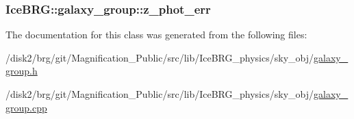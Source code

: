 \subsubsection[{z\+\_\+phot\+\_\+err}]{ Ice\+B\+R\+G\+::galaxy\+\_\+group\+::z\+\_\+phot\+\_\+err}\label{classIceBRG_1_1galaxy__group_a6696a2e58e33e858f1dd40a285cf432a}


The documentation for this class was generated from the following files\+:\begin{DoxyCompactItemize}
\item 
/disk2/brg/git/\+Magnification\+\_\+\+Public/src/lib/\+Ice\+B\+R\+G\+\_\+physics/sky\+\_\+obj/\hyperlink{galaxy__group_8h}{galaxy\+\_\+group.\+h}\item 
/disk2/brg/git/\+Magnification\+\_\+\+Public/src/lib/\+Ice\+B\+R\+G\+\_\+physics/sky\+\_\+obj/\hyperlink{galaxy__group_8cpp}{galaxy\+\_\+group.\+cpp}\end{DoxyCompactItemize}
